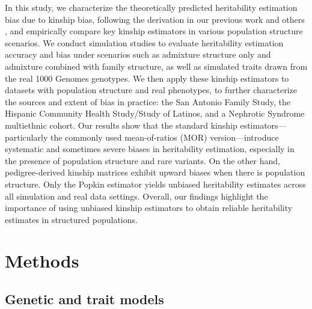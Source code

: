 \documentclass[11pt]{article}
\begin{document}
In this study, we characterize the theoretically predicted heritability estimation bias due to kinship bias, following the derivation in our previous work \citep{hou2023genetic} and others \citep{chen2022kinship}, and empirically compare key kinship estimators in various population structure scenarios. We conduct simulation studies to evaluate heritability estimation accuracy and bias under scenarios such as admixture structure only and admixture combined with family structure, as well as simulated traits drawn from the real 1000 Genomes genotypes. We then apply these kinship estimators to datasets with population structure and real phenotypes, to further characterize the sources and extent of bias in practice: the San Antonio Family Study, the Hispanic Community Health Study/Study of Latinos, and a Nephrotic Syndrome multiethnic cohort. Our results show that the standard kinship estimators—particularly the commonly used mean-of-ratios (MOR) version—introduce systematic and sometimes severe biases in heritability estimation, especially in the presence of population structure and rare variants. On the other hand, pedigree-derived kinship matrices exhibit upward biases when there is population structure.  Only the Popkin estimator yields unbiased heritability estimates across all simulation and real data settings. Overall, our findings highlight the importance of using unbiased kinship estimators to obtain reliable heritability estimates in structured populations.


\section{Methods}

\subsection{Genetic and trait models}
\end{document}
